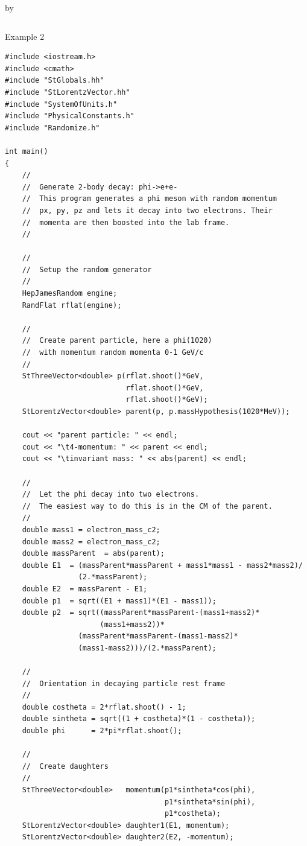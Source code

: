 \documentclass[twoside]{article}
\newcommand{\entrylabel}[1]{\mbox{\textbf{{#1}}}\hfil}%
\newenvironment{entry}
{\begin{list}{}%
    {\renewcommand{\makelabel}{\entrylabel}%
     \setlength{\labelwidth}{90pt}%
     \setlength{\leftmargin}{\labelwidth}
     \advance\leftmargin by \labelsep%
      }%
    }%
  {\end{list}}
\newcommand{\Entrylabel}[1]%
{\raisebox{0pt}[1ex][0pt]{\makebox[\labelwidth][l]%
    {\parbox[t]{\labelwidth}{\hspace{0pt}\textbf{{#1}}}}}}
\newenvironment{Entry}%
{\renewcommand{\entrylabel}{\Entrylabel}\begin{entry}}%
  {\end{entry}}
\begin{document}
\begin{description}
\begin{Entry}
{\begin{verbatim}
\end{verbatim}
} %

\item[Example 2]
{\footnotesize
\begin{verbatim}
#include <iostream.h>
#include <cmath>
#include "StGlobals.hh"
#include "StLorentzVector.hh"
#include "SystemOfUnits.h"
#include "PhysicalConstants.h"
#include "Randomize.h"

int main() 
{    
    //
    //  Generate 2-body decay: phi->e+e-
    //  This program generates a phi meson with random momentum
    //  px, py, pz and lets it decay into two electrons. Their
    //  momenta are then boosted into the lab frame.
    //

    //
    //  Setup the random generator
    //
    HepJamesRandom engine;
    RandFlat rflat(engine);

    //
    //  Create parent particle, here a phi(1020)
    //  with momentum random momenta 0-1 GeV/c
    //
    StThreeVector<double> p(rflat.shoot()*GeV,
                            rflat.shoot()*GeV,
                            rflat.shoot()*GeV);
    StLorentzVector<double> parent(p, p.massHypothesis(1020*MeV));

    cout << "parent particle: " << endl;
    cout << "\t4-momentum: " << parent << endl;
    cout << "\tinvariant mass: " << abs(parent) << endl;
    
    //
    //  Let the phi decay into two electrons.
    //  The easiest way to do this is in the CM of the parent.
    //
    double mass1 = electron_mass_c2;
    double mass2 = electron_mass_c2;
    double massParent  = abs(parent);
    double E1  = (massParent*massParent + mass1*mass1 - mass2*mass2)/
                 (2.*massParent);
    double E2  = massParent - E1;
    double p1  = sqrt((E1 + mass1)*(E1 - mass1));
    double p2  = sqrt((massParent*massParent-(mass1+mass2)*
                      (mass1+mass2))*
                 (massParent*massParent-(mass1-mass2)*
                 (mass1-mass2)))/(2.*massParent);

    //
    //  Orientation in decaying particle rest frame
    //
    double costheta = 2*rflat.shoot() - 1;
    double sintheta = sqrt((1 + costheta)*(1 - costheta));
    double phi      = 2*pi*rflat.shoot();

    //
    //  Create daughters
    //
    StThreeVector<double>   momentum(p1*sintheta*cos(phi),
                                     p1*sintheta*sin(phi),
                                     p1*costheta);
    StLorentzVector<double> daughter1(E1, momentum);
    StLorentzVector<double> daughter2(E2, -momentum);
    

\end{verbatim}}
\end{Entry}
\end{description}
\end{document}
